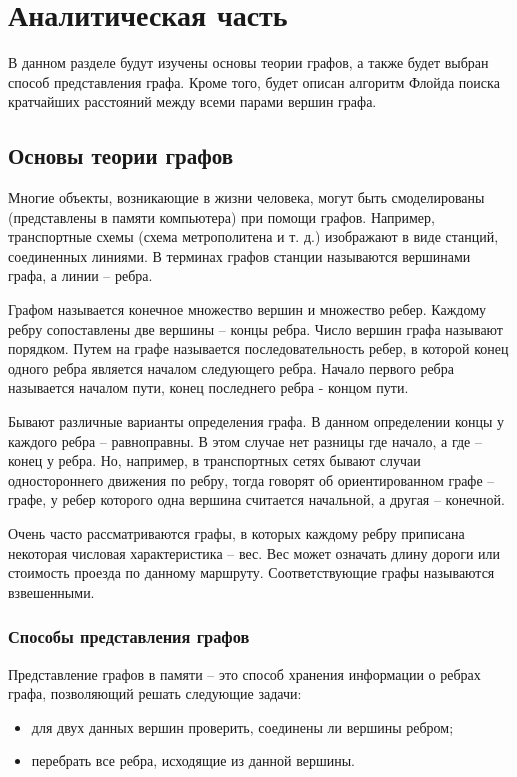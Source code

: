 \chapter{Аналитическая часть}

В данном разделе будут изучены основы теории графов, а также будет выбран способ представления графа. Кроме того, будет описан алгоритм Флойда поиска кратчайших расстояний между всеми парами вершин графа.

\section{Основы теории графов}

Многие объекты, возникающие в жизни человека, могут быть смоделированы (представлены в памяти компьютера) при помощи графов. Например, транспортные схемы (схема метрополитена и т. д.) изображают в виде станций, соединенных линиями. В терминах графов станции называются вершинами графа, а линии -- ребра.

Графом \cite{graph} называется конечное множество вершин и множество ребер. Каждому ребру сопоставлены две вершины – концы ребра. Число вершин графа называют порядком. Путем на графе называется последовательность ребер, в которой конец одного ребра является началом следующего ребра. Начало первого ребра называется началом пути, конец последнего ребра - концом пути.

Бывают различные варианты определения графа. В данном определении концы у каждого ребра -- равноправны. В этом случае нет разницы где начало, а где -- конец у ребра. Но, например, в транспортных сетях бывают случаи одностороннего движения по ребру, тогда говорят об ориентированном графе -- графе, у ребер которого одна вершина считается начальной, а другая -- конечной.

Очень часто рассматриваются графы, в которых каждому ребру приписана некоторая числовая характеристика -- вес. Вес может означать длину дороги или стоимость проезда по данному маршруту. Соответствующие графы называются взвешенными.

\subsection{Способы представления графов}

Представление графов в памяти -- это способ хранения информации о ребрах графа, позволяющий решать следующие задачи:

\begin{itemize}
	\item для двух данных вершин проверить, соединены ли вершины ребром;
	\item перебрать все ребра, исходящие из данной вершины.
\end{itemize}

